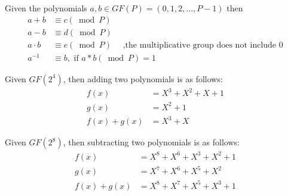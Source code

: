 \begin{rem} Given the polynomials $a,b \in  GF(P) = (0,1,2,...,P-1)$ then 
\begin{align*} 		
		a + b &\equiv c (\bmod P)\\
		a - b &\equiv d (\bmod P)\\
		a \cdot b &\equiv e (\bmod P) \quad \text{ ,the multiplicative group does not include 0}\\
		a^{-1} &\equiv b, \text{~if~} a * b (\bmod P) = 1
\end{align*}
\end{rem}	
\begin{eg} Given $GF(2^4)$, then adding two polynomials is as follows:
\begin{align*}
	f(x) &= X^3 + X^2 + X + 1\\
	g(x) &= X^2  + 1\\
           f(x) + g(x) &= X^3  + X
\end{align*}
\end{eg}

\begin{eg} Given $GF(2^8)$, then subtracting two polynomials is as follows:
\begin{align*}	
	f(x) &= X^8 +         X^6 +          X^3 + X^2 + 1\\
	g(x) &=        X^7 + X^6 + X^5 +          X^2\\
 f(x) + g(x) &= X^8 + X^7 +        X^5  + X^3  +         1
\end{align*}
\\
\end{eg}

